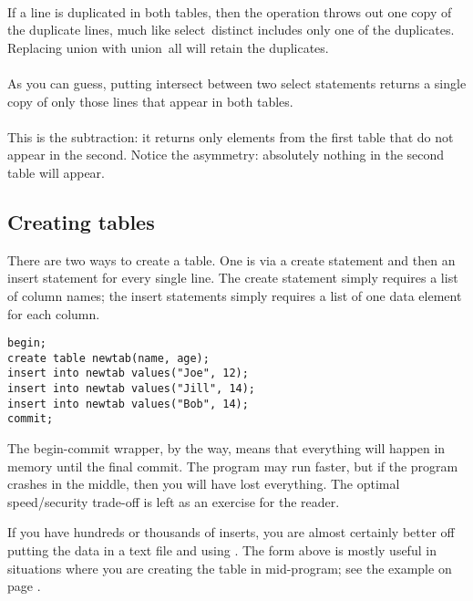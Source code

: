 \paragraph{} If a line is duplicated in both tables,
then the  operation throws out
one copy of the duplicate lines, much like \si{select distinct}
includes only one of the duplicates. Replacing \si{union} with \si{union all} will retain the duplicates.

\paragraph{} As you can guess,
putting \si{intersect} between two \si{select} statements
returns a single copy of only those lines that appear in both tables.

\paragraph{} This is the subtraction: it returns only
elements from the first table that do not appear in the second. Notice
the asymmetry: absolutely nothing in the second table will appear. 

\subsection{Creating tables} 
There are two ways to create a table. One
is via  a \si{create} statement and then an \si{insert} statement
for every single line. The \si{create} statement simply requires a
list of column names; the \si{insert} statements simply requires a
list of one data element for each column.
\begin{lstlisting}
begin;
create table newtab(name, age);
insert into newtab values("Joe", 12);
insert into newtab values("Jill", 14);
insert into newtab values("Bob", 14);
commit;
\end{lstlisting}

The \si{begin}-\si{commit} wrapper, by the way, means that everything
will happen in memory until the final commit. The program may run
faster, but if the program crashes in the middle, then you will have
lost everything.  The optimal speed/security trade-off is left as an
exercise for the reader.

If you have hundreds or thousands of \si{insert}s, you are
almost certainly better off putting the data in a text file and using
. The form above is mostly useful in situations
where you are creating the table in mid-program; see the example on
page \pageref{createeg}.


